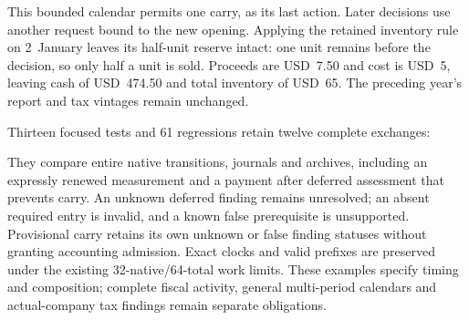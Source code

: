 This bounded calendar permits one carry, as its last action. Later decisions
use another request bound to the new opening. Applying the retained inventory
rule on 2~January leaves its half-unit reserve intact: one unit remains before
the decision, so only half a unit is sold. Proceeds are USD~7.50 and cost is
USD~5, leaving cash of USD~474.50 and total inventory of USD~65. The preceding
year's report and tax vintages remain unchanged.

Thirteen focused tests and 61 regressions retain twelve complete exchanges:
\begin{flushleft}\small
{}
\end{flushleft}
They compare entire native transitions, journals and archives, including an expressly renewed
measurement and a payment after deferred assessment that prevents carry.
An unknown deferred finding remains unresolved; an absent required entry is
invalid, and a known false prerequisite is unsupported. Provisional carry
retains its own unknown or false finding statuses without granting accounting
admission. Exact clocks and valid prefixes are preserved under the existing
32-native/64-total work limits. These examples specify timing and composition;
complete fiscal activity, general multi-period calendars and actual-company
tax findings remain separate obligations.
